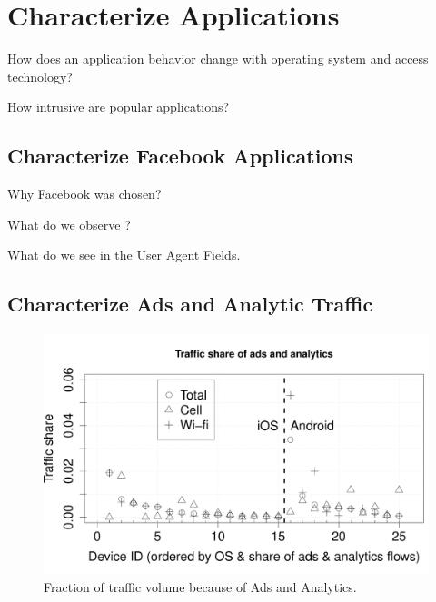 \section{Characterize Applications}
\label{sec:characterize-app}

\begin{packedenumerate}
\item How does an application behavior change with operating system and access technology?
\item How intrusive are popular applications?
\end{packedenumerate}

\subsection{Characterize Facebook Applications}

Why Facebook was chosen?

What do we observe ?

What do we see in the User Agent Fields. 


\subsection{Characterize Ads and Analytic Traffic}

\begin{figure}
\includegraphics[width=\columnwidth]{plots/ad_share_bytes.pdf}
\caption{Fraction of traffic volume because of Ads and Analytics. \emph{}}
\label{fig:description}
\end{figure}

